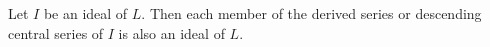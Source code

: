 Let $I$ be an ideal of $L$. Then each member of the derived series or descending central series of $I$ is also an ideal of $L$.
